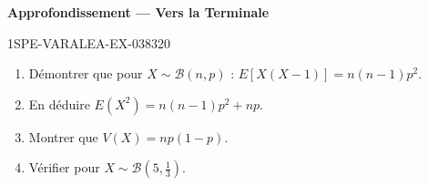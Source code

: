 \begin{center}\textbf{Approfondissement — Vers la Terminale}\end{center}
\begin{exercice}{1SPE-VARALEA-EX-038}{3}{20}
\begin{enumerate}
  \item Démontrer que pour $X \sim \mathcal{B}(n,p)$ : $E[X(X-1)] = n(n-1)p^2$.
  \item En déduire $E(X^2) = n(n-1)p^2 + np$.
  \item Montrer que $V(X) = np(1-p)$.
  \item Vérifier pour $X \sim \mathcal{B}(5, \frac{1}{3})$.
\end{enumerate}
\end{exercice}
